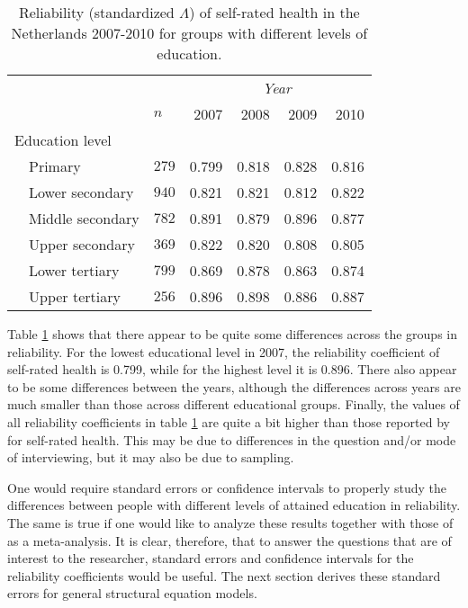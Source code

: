 \documentclass[a4paper, 11pt]{article}
\newcommand{\0}{\boldsymbol{0}}
\begin{document}
\begin{table}[bth]
\begin{center}\begin{small}
\begin{tabular}{lllrrrr}  \hline  \hline
&&&  \multicolumn{4}{c}{\emph{Year}}\\\cline{4-7}
&&$n$& 2007&2008&2009&2010\\
  \hline
  \multicolumn{2}{l}{Education level}\\
& Primary	   & $279$  & 0.799 & 0.818 & 0.828 & 0.816 \\ 
& Lower secondary  & $940$  & 0.821 & 0.821 & 0.812 & 0.822 \\ 
& Middle secondary & $782$  & 0.891 & 0.879 & 0.896 & 0.877 \\ 
& Upper secondary  & $369$  & 0.822 & 0.820 & 0.808 & 0.805 \\ 
& Lower tertiary   & $799$  & 0.869 & 0.878 & 0.863 & 0.874 \\ 
& Upper tertiary   & $256$  & 0.896 & 0.898 & 0.886 & 0.887 \\ 
  \hline     \hline
\end{tabular}
\caption{Reliability (standardized $\Lambda$) of self-rated health in the Netherlands 2007-2010 for groups with different levels of education.}\label{tab:first-results}\end{small}
\end{center}
\end{table}

Table \ref{tab:first-results} shows that there appear to be quite some differences across the groups in reliability. 
For the lowest educational level in 2007, the reliability coefficient of self-rated health is 0.799, while for the highest level it is 0.896.
There also appear to be some differences between the years, although the differences across years are much smaller than those across
different educational groups. Finally, the values of all reliability coefficients in table \ref{tab:first-results} are quite a bit higher than those reported by \cite{lundberg1996assessing} 
for self-rated health. This may be due to differences in the question and/or mode of interviewing, but it may also be due to sampling. 

One would require standard errors or confidence intervals to properly study the differences between people with different levels of attained education in reliability. The same is true if one would like to analyze these results together with those of \cite{lundberg1996assessing}  as a meta-analysis.
It is clear, therefore, that to answer the questions that are of interest to the researcher, standard errors and confidence intervals for the 
reliability coefficients would be useful. The next section derives these standard errors for general structural equation models. 
\end{document}
